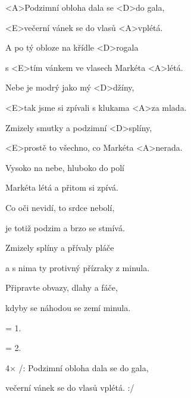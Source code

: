 

\zs
<A>Podzimní obloha dala se <D>do gala,

<E>večerní vánek se do vlasů <A>vplétá.

A po tý obloze na křídle <D>rogala

s <E>tím vánkem ve vlasech Markéta <A>létá.

Nebe je modrý jako mý <D>džíny,

<E>tak jsme si zpívali s klukama <A>za mlada.

Zmizely smutky a podzimní <D>splíny,

<E>prostě to všechno, co Markéta <A>nerada.
\ks

\zs
Vysoko na nebe, hluboko do polí

Markéta létá a přitom si zpívá.

Co oči nevidí, to srdce nebolí,

je totiž podzim a brzo se stmívá.

Zmizely splíny a přívaly pláče

a s nima ty protivný přízraky z minula.

Připravte obvazy, dlahy a fáče,

kdyby se náhodou se zemí minula.
\ks

\zs
= 1.
\ks

\zs
= 2.
\ks

4× /: Podzimní obloha dala se do gala,

večerní vánek se do vlasů vplétá. :/

\kp

